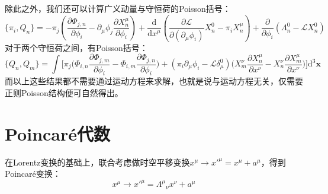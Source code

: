 除此之外，我们还可以计算广义动量与守恒荷的Poisson括号：
\begin{equation}
\{\pi_i,Q_n\}=-\pi_j\left(\frac{\partial\Phi_{j,n}}{\partial\phi_i}-\partial_\mu\phi_j\frac{\partial X^\mu_n}{\partial\phi_i}\right)+\frac{\mathrm{d}}{\mathrm{d}x^\mu}\left(\frac{\partial\mathscr{L}}{\partial(\partial_\mu\phi_i)}X^0_n-\pi_i X^\mu_n\right)+\frac{\partial}{\partial\phi_i}(\Lambda^0_n-\mathscr{L}X^0_n)
\end{equation}
对于两个守恒荷之间，有Poisson括号：
\begin{equation}
\{Q_n,Q_m\}=\int\Big[\pi_j\Big(\Phi_{i,n}\frac{\partial\Phi_{j,m}}{\partial\phi_i}-\Phi_{i,m}\frac{\partial\Phi_{j,n}}{\partial\phi_i}\Big)+(\pi_i\partial_\mu\phi_{i}-\mathscr{L}\delta^0_\mu)\Big(X^\nu_m\frac{\partial X^\mu_n}{\partial x^\nu}-X^\nu_n\frac{\partial X^\mu_m}{\partial x^\nu}\Big)\Big] \mathrm{d}^3\boldsymbol{x}
\end{equation}
而以上这些结果都不需要通过运动方程来求解，也就是说与运动方程无关，仅需要正则Poisson结构便可自然得出。

\section{Poincar\'e代数}
\par 在Lorentz变换的基础上，联合考虑做时空平移变换$x^\mu\rightarrow x'^\mu=x^\mu+a^\mu$，得到Poincar\'e变换：
\begin{equation}
	x^\mu\rightarrow x'^\mu={\Lambda^\mu}_\nu x^\nu+a^\mu
\end{equation}

